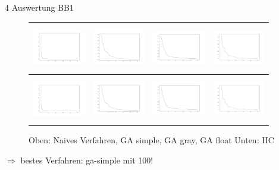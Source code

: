\documentclass{ocbeameruni}
\begin{document}
\begin{frame}{4 Auswertung BB1}
    \begin{center}
    \begin{figure}
    \begin{tabular}{|c|c|c|c|} 
      \hline
      \includegraphics[width=23mm, height=20mm]{plots/bb1_naive.png} 
    & \includegraphics[width=23mm, height=20mm]{plots/bb1_ga_simple.png} 
    & \includegraphics[width=23mm, height=20mm]{plots/bb1_ga_gray.png}
    & \includegraphics[width=23mm, height=20mm]{plots/bb1_ga_float.png} \\ \hline
      \includegraphics[width=23mm, height=20mm]{plots/bb1_naive.png} 
    & \includegraphics[width=23mm, height=20mm]{plots/bb1_ga_simple.png} 
    & \includegraphics[width=23mm, height=20mm]{plots/bb1_ga_gray.png}
    & \includegraphics[width=23mm, height=20mm]{plots/bb1_ga_float.png} \\ \hline
    \end{tabular}
    \caption{Oben: Naives Verfahren, GA simple, GA gray, GA float \hspace{\textwidth}Unten: HC}
    \end{figure}
    $\Rightarrow$ bestes Verfahren: ga-simple mit 100!
    \end{center}
\end{frame}
\end{document}
